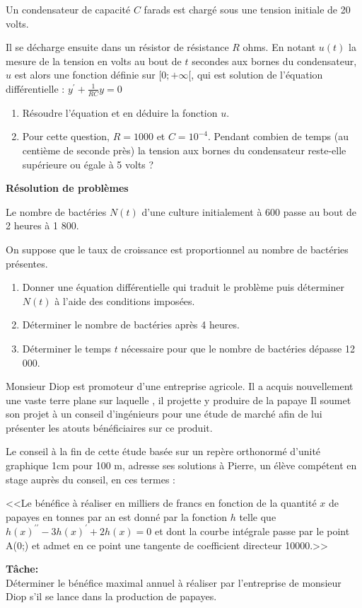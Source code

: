   \begin{exercice} 
Un condensateur de capacité $ C $  farads est chargé sous une tension initiale de 20 volts.

 Il se
décharge ensuite dans un résistor de résistance $ R $ ohms.
En notant $ u(t) $ la mesure de la tension en volts au bout de
$ t $ secondes aux bornes du condensateur, $ u $ est alors une
fonction définie sur  $[0 ; +\infty[ $, qui est solution de l'équation  différentielle : \; $ y^{\prime}+\frac{1}{RC}y=0 $
\begin{enumerate}
\item  Résoudre l'équation et en déduire la fonction $ u $.
\item  Pour cette question, $R = 1 000$ et $C = 10^{-4} $.
Pendant combien de temps (au centième de seconde près)
la tension aux bornes du condensateur reste-elle supérieure
ou égale à 5 volts ?
\end{enumerate}
\end{exercice}
  
  
  \bigskip
\textbf {Résolution de problèmes}
 \begin{exercice}
 Le nombre de bactéries $N(t)$ d'une culture initialement à 600 passe au bout de 2 heures à 1 800.
 
On suppose que le taux de croissance est proportionnel au nombre de bactéries présentes.
\begin{enumerate}
\item   Donner une équation différentielle qui traduit le problème puis déterminer $N(t)$ à l'aide des
conditions imposées.
\item  Déterminer le nombre de bactéries après 4 heures.
\item   Déterminer le temps $t$ nécessaire pour que le nombre de bactéries dépasse 12 000.
\end{enumerate}
\end{exercice}
  \begin{exercice} 
  Monsieur Diop est promoteur d'une entreprise agricole. Il a acquis nouvellement une vaste terre plane 
 sur laquelle , il projette y produire de la papaye
Il soumet son projet à un conseil d'ingénieurs pour une étude de marché afin de lui présenter les atouts bénéficiaires sur  ce produit.

Le conseil à la fin de cette étude basée sur un repère orthonormé 
d'unité graphique 1cm pour 100 m, adresse ses solutions à Pierre, un élève compétent en stage auprès du conseil, en ces termes :

<<Le bénéfice à réaliser en milliers de francs en fonction de la quantité $ x $ de papayes en tonnes par an est donné par la fonction $ h $ telle que  $ h(x)^{\prime\prime }-3 h(x)^{\prime} +2h(x)=0  $
et dont la courbe intégrale 
passe par le point  A(0;)
et admet en ce point une tangente de coefficient directeur 10000.>>

\medskip
\textbf{Tâche:}\\
  Déterminer le bénéfice maximal annuel à réaliser par l'entreprise de monsieur Diop s'il se lance dans la production de papayes. 
\end{exercice}


